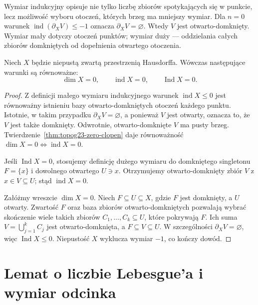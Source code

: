 \begin{uwaga}
\label{rem:topog23-boundary-ind}
Wymiar indukcyjny opisuje nie tylko
liczbę zbiorów spotykających się w punkcie,
lecz możliwość wyboru otoczeń,
których brzeg ma mniejszy wymiar.
Dla \(n=0\) warunek
\(\operatorname{ind}(\partial_XV)\le-1\)
oznacza \(\partial_XV=\varnothing\).
Wtedy \(V\) jest otwarto-domknięty.
Wymiar mały dotyczy otoczeń punktów;
wymiar duży --- oddzielania
całych zbiorów domkniętych od dopełnienia
otwartego otoczenia.
\end{uwaga}

\begin{twierdzenie}
\label{thm:topog23-three-zero}
Niech \(X\) będzie niepustą zwartą
przestrzenią Hausdorffa.
Wówczas następujące warunki są równoważne:
\[
 \dim X=0,\qquad
 \operatorname{ind}X=0,\qquad
 \operatorname{Ind}X=0.
\]
\end{twierdzenie}
\begin{proof}
Z definicji małego wymiaru indukcyjnego
warunek \(\operatorname{ind}X\le0\)
jest równoważny istnieniu bazy
otwarto-domkniętych otoczeń każdego punktu.
Istotnie, w takim przypadku
\(\partial_XV=\varnothing\), a ponieważ
\(V\) jest otwarty, oznacza to,
że \(V\) jest także domknięty.
Odwrotnie, otwarto-domknięte \(V\)
ma pusty brzeg.
Twierdzenie~\ref{thm:topog23-zero-clopen}
daje równoważność
\(\dim X=0\Longleftrightarrow
 \operatorname{ind}X=0\).

Jeśli \(\operatorname{Ind}X=0\),
stosujemy definicję dużego wymiaru
do domkniętego singletonu \(F=\{x\}\)
i dowolnego otwartego \(U\ni x\).
Otrzymujemy otwarto-domknięty zbiór \(V\)
z \(x\in V\subseteq U\);
stąd \(\operatorname{ind}X=0\).

Załóżmy wreszcie \(\dim X=0\).
Niech \(F\subseteq U\subseteq X\),
gdzie \(F\) jest domknięty, a \(U\) otwarty.
Zwartość \(F\) oraz baza zbiorów
otwarto-domkniętych pozwalają wybrać
skończenie wiele takich zbiorów
\(C_1,\ldots,C_k\subseteq U\),
które pokrywają \(F\).
Ich suma \(V=\bigcup_{j=1}^k C_j\)
jest otwarto-domknięta,
a \(F\subseteq V\subseteq U\).
W szczególności \(\partial_XV=\varnothing\),
więc \(\operatorname{Ind}X\le0\).
Niepustość \(X\) wyklucza wymiar \(-1\),
co kończy dowód.
\end{proof}

\section{Lemat o liczbie Lebesgue'a i wymiar odcinka}
\label{sec:topog23-interval}

